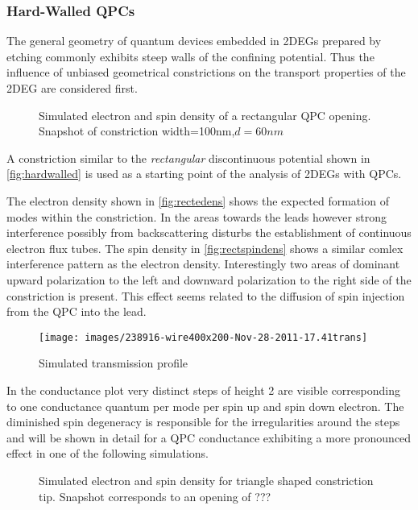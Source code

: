 \subsubsection{Hard-Walled QPCs}
The general geometry of quantum devices embedded in 2DEGs prepared by etching commonly exhibits steep walls of the confining potential. Thus the influence of unbiased geometrical constrictions on the transport properties of the 2DEG are considered first.
\begin{figure}[h]
\caption{Simulated electron and spin density of a rectangular QPC opening. Snapshot of constriction width=100nm,$d=60nm$}
\end{figure}
A constriction similar to the \emph{rectangular} discontinuous potential shown in \cref{fig:hardwalled} is used as a starting point of the analysis of 2DEGs with QPCs.\par
The electron density shown in \cref{fig:rectedens} shows the expected formation of modes within the constriction. In the areas towards the leads however strong interference possibly from backscattering disturbs the establishment of continuous electron flux tubes. The spin density in \cref{fig:rectspindens} shows a similar comlex interference pattern as the electron density. Interestingly two areas of dominant upward polarization to the left and downward polarization to the right side of the constriction is present. This effect seems related to the diffusion of spin injection from the QPC into the lead.\par
\begin{figure}[h]
\centering
\texttt{[image: images/238916-wire400x200-Nov-28-2011-17.41trans]}
\caption{Simulated transmission profile}
\end{figure}
In the conductance plot very distinct steps of height 2 are visible corresponding to one conductance quantum per mode per spin up and spin down electron. The diminished spin degeneracy is responsible for the irregularities around the steps and will be shown in detail for a QPC conductance exhibiting a more pronounced effect in one of the following simulations.\par
\begin{figure}[h]
\caption{Simulated electron and spin density for triangle shaped constriction tip. Snapshot corresponds to an opening of ???}
\end{figure}
